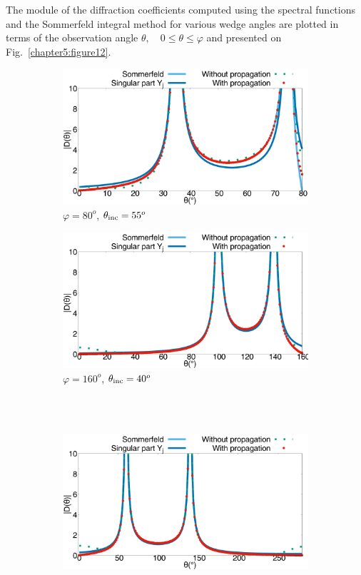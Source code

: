 The module of the diffraction coefficients computed using the spectral functions and the Sommerfeld integral method for various wedge angles are plotted in terms of the observation angle $\theta, \quad 0\leq \theta\leq \varphi$ and presented on Fig.~\ref{chapter5:figure12}. 
\begin{figure}[h!]
\centering
\begin{subfigure}[b]{0.49\textwidth}
        \includegraphics[width=\textwidth]{images/chapter2/Figure8a.pdf}
        \caption{$\varphi = 80^o$, $\theta_{\rm inc} = 55^o$}
        \label{chapter5:figure12a}
    \end{subfigure}
\begin{subfigure}[b]{0.49\textwidth}
        \includegraphics[width=\textwidth]{images/chapter2/Figure8b.pdf}
        \caption{$\varphi = 160^o$, $\theta_{\rm inc} = 40^o$}
        \label{chapter5:figure12b}
    \end{subfigure}
\\
~\\
\begin{subfigure}[b]{0.49\textwidth}
        \includegraphics[width=\textwidth]{images/chapter2/Figure8c.pdf}

\end{subfigure}
\end{figure}
